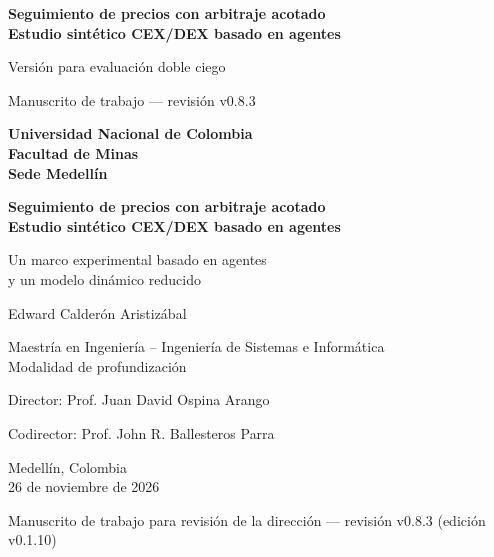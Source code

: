 \documentclass[11pt,letterpaper]{report}
\newcommand{\versionTesis}{v0.1.10}
\newcommand{\revisionManuscrito}{v0.8.3}
\numberwithin{equation}{chapter}
\begin{document}
\begin{titlepage}
  \thispagestyle{empty}
  \centering
  \singlespacing
  \ifdefined\blindreviewmode
  \vspace*{4cm}
  {\LARGE\bfseries Seguimiento de precios con arbitraje acotado\\
  Estudio sintético CEX/DEX basado en agentes\par}
  \vspace{1.2cm}
  {\Large Versión para evaluación doble ciego\par}
  \vfill
  {\small Manuscrito de trabajo --- revisión \revisionManuscrito{}\par}
  \else
  {\large\bfseries Universidad Nacional de Colombia\\[2pt]
  Facultad de Minas\\[2pt]
  Sede Medellín\par}
  \vspace{3.2cm}
  {\LARGE\bfseries Seguimiento de precios con arbitraje acotado\\
  Estudio sintético CEX/DEX basado en agentes\par}
  \vspace{0.9cm}
  {\Large Un marco experimental basado en agentes\\
  y un modelo dinámico reducido\par}
  \vspace{2.6cm}
  {\Large Edward Calderón Aristizábal\par}
  \vspace{1.6cm}
  {\large Maestría en Ingeniería -- Ingeniería de Sistemas e Informática\\[2pt]
  Modalidad de profundización\par}
  \vspace{0.8cm}
  {\large Director: Prof. Juan David Ospina Arango\par}
  {\large Codirector: Prof. John R. Ballesteros Parra\par}
  \vfill
  {\large Medellín, Colombia\\[2pt]
  26 de noviembre de 2026\par}
  \vspace{0.3cm}
  {\small Manuscrito de trabajo para revisión de la dirección --- revisión \revisionManuscrito{} (edición \versionTesis{})\par}
  \fi
\end{titlepage}

\setcounter{page}{1}
\end{document}
